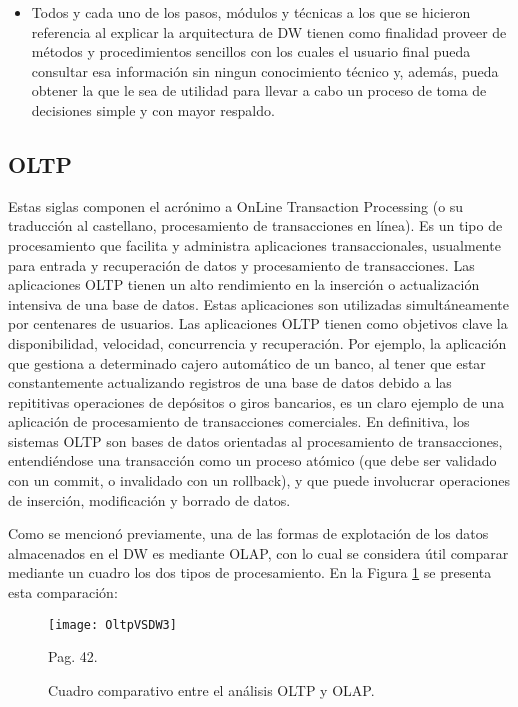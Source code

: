 \documentclass[a4paper,11pt]{article}
\begin{document}
\begin{flushleft}
\begin{itemize}
      \item Todos y cada uno de los pasos, módulos y técnicas a los que se hicieron referencia al explicar la arquitectura de DW tienen como finalidad
      proveer de métodos y procedimientos sencillos con los cuales el usuario final pueda consultar esa información sin ningun conocimiento técnico y,
      además, pueda obtener la que le sea de utilidad para llevar a cabo un proceso de toma de decisiones simple y con mayor respaldo.
    \end{itemize}
    
    
    \subsection{OLTP}
    
    Estas siglas componen el acrónimo a OnLine Transaction Processing (o su traducción al castellano, procesamiento de transacciones en línea). Es un tipo
    de procesamiento que facilita y administra aplicaciones transaccionales, usualmente para entrada y recuperación de datos y procesamiento de
    transacciones.
    Las aplicaciones OLTP tienen un alto rendimiento en la inserción o actualización intensiva de una base de datos. Estas aplicaciones son utilizadas
    simultáneamente por centenares de usuarios. Las aplicaciones OLTP tienen como objetivos clave la disponibilidad, velocidad, concurrencia y recuperación.
    Por ejemplo, la aplicación que gestiona a determinado cajero automático de un banco, al tener que estar constantemente actualizando registros de una
    base de datos debido a las repititivas operaciones de depósitos o giros bancarios, es un claro ejemplo de una aplicación de procesamiento de
    transacciones comerciales.
    En definitiva, los sistemas OLTP son bases de datos orientadas al procesamiento de transacciones, entendiéndose una transacción como un proceso
    atómico (que debe ser validado con un commit, o invalidado con un rollback), y que puede involucrar operaciones de inserción, modificación y
    borrado de datos.\par
    
    Como se mencionó previamente, una de las formas de explotación de los datos almacenados en el DW es mediante OLAP, con lo cual se considera útil
    comparar mediante un cuadro los dos tipos de procesamiento. En la Figura \ref{oltp_vs_olap} se presenta esta comparación:
    
    \begin{figure}
      \begin{center}
        \texttt{[image: OltpVSDW3]}
        \caption{Cuadro comparativo entre el análisis OLTP y OLAP.} \cite{hefestov2} Pag. 42.
        \label{oltp_vs_olap}
      \end{center}
    \end{figure}
    

\end{flushleft}
\end{document}
